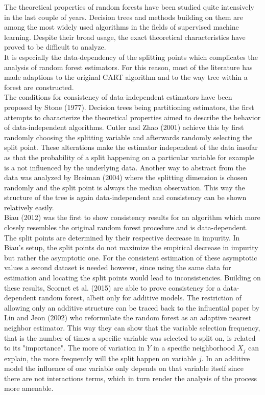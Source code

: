 {The theoretical properties of random forests have been studied quite intensively in the last couple of years. Decision trees and methods building on them are among the most widely used algorithms in the fields of supervised machine learning. Despite their broad usage, the exact theoretical characteristics have proved to be difficult to analyze. \\
It is especially the data-dependency of the splitting points which complicates the analysis of random forest estimators. For this reason, most of the literature has made adaptions to the original CART algorithm and to the way tree within a forest are constructed. \\
The conditions for consistency of data-independent estimators have been proposed by Stone (1977). Decision trees being partitioning estimators, the first attempts to characterize the theoretical properties aimed to describe the behavior of data-independent algorithms. Cutler and Zhao (2001) achieve this by first randomly choosing the splitting variable and afterwards randomly selecting the split point. These alterations make the estimator independent of the data insofar as that the probability of a split happening on a particular variable for example is a not influenced by the underlying data. Another way to abstract from the data was analyzed by Breiman (2004) where the splitting dimension is chosen randomly and the split point is always the median observation. This way the structure of the tree is again data-independent and consistency can be shown relatively easily. \\
Biau (2012) was the first to show consistency results for an algorithm which more closely resembles the original random forest procedure and is data-dependent. The split points are determined by their respective decrease in impurity. In Biau's setup, the split points do not maximize the empirical decrease in impurity but rather the asymptotic one. For the consistent estimation of these asymptotic values a second dataset is needed however, since using the same data for estimation and locating the split points would lead to inconsistencies. Building on these results, Scornet et al. (2015) are able to prove consistency for a data-dependent random forest, albeit only for additive models. The restriction of allowing only an additive structure can be traced back to the influential paper by Lin and Jeon (2002) who reformulate the random forest as an adaptive nearest neighbor estimator. This way they can show that the variable selection frequency, that is the number of times a specific variable was selected to split on, is related to its "importance". The more of variation in $Y$ in a specific neighborhood $X_j$ can explain, the more frequently will the split happen on variable $j$. In an additive model the influence of one variable only depends on that variable itself since there are not interactions terms, which in turn render the analysis of the process more amenable. \\
}
